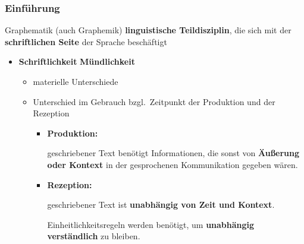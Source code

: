 \begin{frame}
\frametitle{Einführung}

\begin{block}{Graphematik (auch Graphemik)}
	 \textbf{linguistische Teildisziplin}, die sich mit der \textbf{schriftlichen Seite} der Sprache beschäftigt
\end{block}

\pause 

\begin{itemize}

	\item \textbf{Schriftlichkeit} \vs \textbf{Mündlichkeit}
	
	\begin{itemize}
		\item materielle Unterschiede
		\item Unterschied im Gebrauch bzgl.\ Zeitpunkt der Produktion und der Rezeption
		
		\begin{itemize}
			\item  \textbf{Produktion:} 
			
			geschriebener Text benötigt Informationen, die sonst von \textbf{Äußerung oder Kontext} in der gesprochenen Kommunikation gegeben wären.
	
			\item \textbf{Rezeption:} 
			
			geschriebener Text ist \textbf{unabhängig von Zeit und Kontext}.
			
			Einheitlichkeitsregeln werden benötigt, um \textbf{unabhängig verständlich} zu bleiben.
		\end{itemize}

	\end{itemize} 

\end{itemize}

\end{frame}


